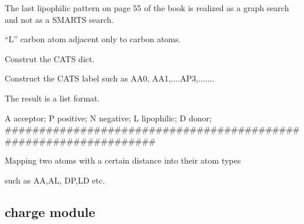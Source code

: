 \documentclass[letterpaper,10pt,english]{sphinxmanual}
\begin{document}

\begin{fulllineitems}
\label{reference/cats2d:cats2d.ContructLFromGraphSearch}
The last lipophilic pattern on page 55 of the book is realized as a graph 
search and not as a SMARTS search.

``L'' carbon atom adjacent only to carbon atoms.

\end{fulllineitems}


\begin{fulllineitems}
\label{reference/cats2d:cats2d.FormCATSDict}
Construt the CATS dict.

\end{fulllineitems}


\begin{fulllineitems}
\label{reference/cats2d:cats2d.FormCATSLabel}
Construct the CATS label such as AA0, AA1,....AP3,.......

The result is a list format.

A   acceptor;
P   positive;
N   negative;
L   lipophilic;
D   donor;
\#\#\#\#\#\#\#\#\#\#\#\#\#\#\#\#\#\#\#\#\#\#\#\#\#\#\#\#\#\#\#\#\#\#\#\#\#\#\#\#\#\#\#\#\#\#\#\#\#\#\#\#\#\#\#\#\#\#\#\#\#\#\#\#\#

\end{fulllineitems}


\begin{fulllineitems}
\label{reference/cats2d:cats2d.MatchAtomType}
Mapping two atoms with a certain distance into their atom types

such as AA,AL, DP,LD etc.

\end{fulllineitems}



\subsection{charge module}
\label{reference/charge:module-charge}\label{reference/charge:charge-module}\label{reference/charge::doc}
\end{document}
